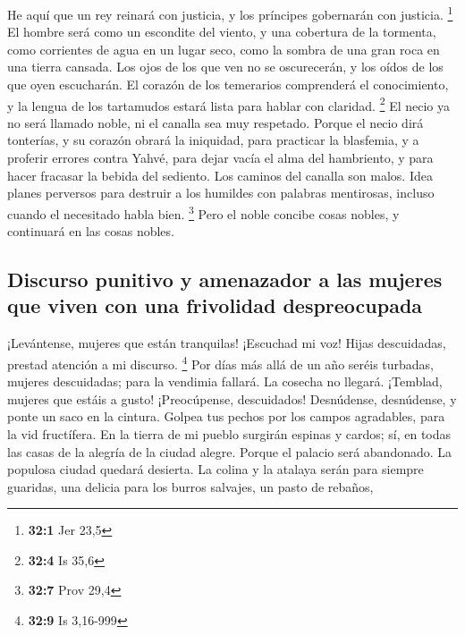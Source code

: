 \begin{paracol}{2}
 He aquí que un rey reinará con justicia, y los príncipes
gobernarán con justicia. \footnote{\textbf{32:1} Jer 23,5}
 El hombre será como un escondite del viento, y una
cobertura de la tormenta, como corrientes de agua en un lugar seco, como
la sombra de una gran roca en una tierra cansada.  Los
ojos de los que ven no se oscurecerán, y los oídos de los que oyen
escucharán.  El corazón de los temerarios comprenderá el
conocimiento, y la lengua de los tartamudos estará lista para hablar con
claridad. \footnote{\textbf{32:4} Is 35,6}  El necio ya no
será llamado noble, ni el canalla sea muy respetado. 
Porque el necio dirá tonterías, y su corazón obrará la iniquidad, para
practicar la blasfemia, y a proferir errores contra Yahvé, para dejar
vacía el alma del hambriento, y para hacer fracasar la bebida del
sediento.  Los caminos del canalla son malos. Idea planes
perversos para destruir a los humildes con palabras mentirosas, incluso
cuando el necesitado habla bien. \footnote{\textbf{32:7} Prov 29,4}
 Pero el noble concibe cosas nobles, y continuará en las
cosas nobles.

\hypertarget{discurso-punitivo-y-amenazador-a-las-mujeres-que-viven-con-una-frivolidad-despreocupada}{%
\subsection{Discurso punitivo y amenazador a las mujeres que viven con
una frivolidad
despreocupada}\label{discurso-punitivo-y-amenazador-a-las-mujeres-que-viven-con-una-frivolidad-despreocupada}}

 ¡Levántense, mujeres que están tranquilas! ¡Escuchad mi
voz! Hijas descuidadas, prestad atención a mi discurso. \footnote{\textbf{32:9}
  Is 3,16-999}  Por días más allá de un año seréis
turbadas, mujeres descuidadas; para la vendimia fallará. La cosecha no
llegará.  ¡Temblad, mujeres que estáis a gusto!
¡Preocúpense, descuidados! Desnúdense, desnúdense, y ponte un saco en la
cintura.  Golpea tus pechos por los campos agradables,
para la vid fructífera.  En la tierra de mi pueblo
surgirán espinas y cardos; sí, en todas las casas de la alegría de la
ciudad alegre.  Porque el palacio será abandonado. La
populosa ciudad quedará desierta. La colina y la atalaya serán para
siempre guaridas, una delicia para los burros salvajes, un pasto de
rebaños,


\end{paracol}
